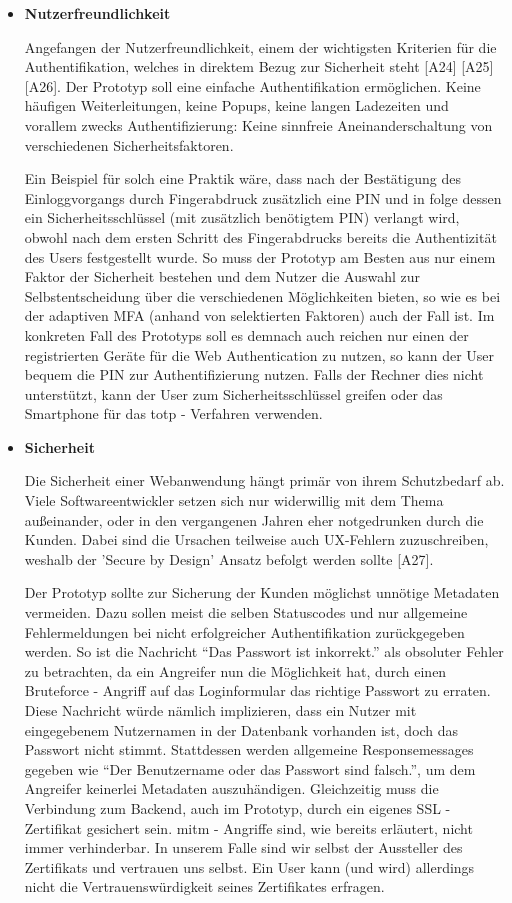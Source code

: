 \begin{itemize} 
\item \textbf{Nutzerfreundlichkeit}

Angefangen der Nutzerfreundlichkeit, einem der wichtigsten Kriterien für die Authentifikation, welches in direktem Bezug zur Sicherheit steht [A24] [A25] [A26]. Der Prototyp soll eine einfache Authentifikation ermöglichen. Keine häufigen Weiterleitungen, keine Popups, keine langen Ladezeiten und vorallem zwecks Authentifizierung: Keine sinnfreie Aneinanderschaltung von verschiedenen Sicherheitsfaktoren.
\newpage

Ein Beispiel für solch eine Praktik wäre, dass nach der Bestätigung des Einloggvorgangs durch Fingerabdruck zusätzlich eine PIN und in folge dessen ein Sicherheitsschlüssel (mit zusätzlich benötigtem PIN) verlangt wird, obwohl nach dem ersten Schritt des Fingerabdrucks bereits die Authentizität des Users festgestellt wurde. So muss der Prototyp am Besten aus nur einem Faktor der Sicherheit bestehen und dem Nutzer die Auswahl zur Selbstentscheidung über die verschiedenen Möglichkeiten bieten, so wie es bei der adaptiven MFA (anhand von selektierten Faktoren) auch der Fall ist. Im konkreten Fall des Prototyps soll es demnach auch reichen nur einen der registrierten Geräte für die Web Authentication zu nutzen, so kann der User bequem die PIN zur Authentifizierung nutzen. Falls der Rechner dies nicht unterstützt, kann der User zum Sicherheitsschlüssel greifen oder das Smartphone für das \ac{totp} - Verfahren verwenden.

\item \textbf{Sicherheit}

Die Sicherheit einer Webanwendung hängt primär von ihrem Schutzbedarf ab. Viele Softwareentwickler setzen sich nur widerwillig mit dem Thema außeinander, oder in den vergangenen Jahren eher notgedrunken durch die Kunden. Dabei sind die Ursachen teilweise auch UX-Fehlern zuzuschreiben, weshalb der 'Secure by Design' Ansatz befolgt werden sollte [A27].

Der Prototyp sollte zur Sicherung der Kunden möglichst unnötige Metadaten vermeiden. Dazu sollen meist die selben Statuscodes und nur allgemeine Fehlermeldungen bei nicht erfolgreicher Authentifikation zurückgegeben werden. So ist die Nachricht ``Das Passwort ist inkorrekt.'' als obsoluter Fehler zu betrachten, da ein Angreifer nun die Möglichkeit hat, durch einen Bruteforce - Angriff auf das Loginformular das richtige Passwort zu erraten. Diese Nachricht würde nämlich implizieren, dass ein Nutzer mit eingegebenem Nutzernamen in der Datenbank vorhanden ist, doch das Passwort nicht stimmt. Stattdessen werden allgemeine Responsemessages gegeben wie ``Der Benutzername oder das Passwort sind falsch.'', um dem Angreifer keinerlei Metadaten auszuhändigen. Gleichzeitig muss die Verbindung zum Backend, auch im Prototyp, durch ein eigenes SSL - Zertifikat gesichert sein. \ac{mitm} - Angriffe sind, wie bereits erläutert, nicht immer verhinderbar. In unserem Falle sind wir selbst der Aussteller des Zertifikats und vertrauen uns selbst. Ein User kann (und wird) allerdings nicht die Vertrauenswürdigkeit seines Zertifikates erfragen.
\newpage


\end{itemize}

